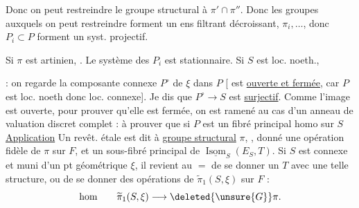 Donc on peut restreindre le groupe structural à $\pi'\cap\pi''$. Donc les groupes auxquels on peut restreindre forment un ens filtrant décroissant, $\pi_i,\ldots$, donc $P_i\subset P$ forment un syst. projectif.

Si  $\pi$ est artinien, . Le système des $P_i$ est  stationnaire. Si $S$ est loc. noeth.,  

: on regarde la composante connexe $P^\circ$ de $\xi$ dans $P$ [ est \uline{ouverte et fermée}, car $P$ est loc. noeth donc loc. connexe]. Je dis que $P^\circ\to S$ est \uline{surjectif}. Comme l'image est ouverte, pour prouver qu'elle est fermée, on est ramené au cas d'un anneau de valuation discret complet : à prouver que si $P$ est un fibré principal homo sur $S$
\uline{Application} Un revêt. étale  est dit à \uline{groupe structural} $\pi$, ,   donné une opération fidèle de $\pi$ sur $F$, et un sous-fibré  principal de $\underline{\operatorname{Isom}}_S(E_S,T)$. Si $S$ est connexe et muni d'un pt géométrique $\xi$, il revient au $=$ de se donner un $T$ avec une telle structure, ou de se donner des opérations  de $\widetilde\pi_1(S,\xi)$  sur $F$ :
\[
\text{hom}\qquad\widetilde\pi_1(S,\xi)\longrightarrow\deleted{\unsure{G}}\pi.
\]

